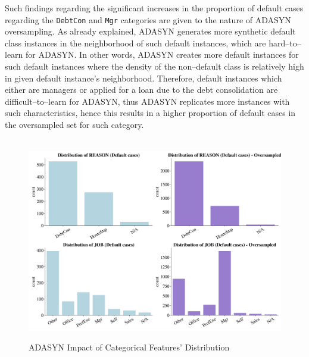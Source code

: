 Such findings regarding the significant increases in the proportion of default cases regarding the \texttt{DebtCon} and \texttt{Mgr} categories are given to the nature of ADASYN oversampling.
As already explained, ADASYN generates more synthetic default class instances in the neighborhood of such default instances, which are hard--to--learn for ADASYN.
In other words, ADASYN creates more default instances for such default instances where the density of the non--default class is relatively high in given default instance's neighborhood.
Therefore, default instances which either are managers or applied for a loan due to the debt consolidation are difficult--to--learn for ADASYN, thus ADASYN replicates more instances with such characteristics, hence this results in a higher proportion of default cases in the oversampled set for such category.


\begin{figure}[H]
    \centering
    \caption{ADASYN Impact of Categorical Features' Distribution}\vspace{0.5em}
    \label{fig:adasynimpact}\
    \includegraphics[width=130mm]{Figures/Categorical_Features_Distribution_OS_Default.jpg}

    \vspace{-1em}
\end{figure}



\newpage
